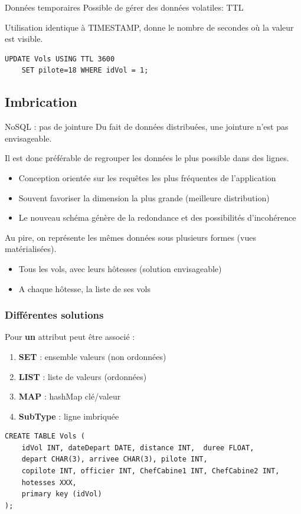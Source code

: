 \begin{frame}[fragile]{Données temporaires}
	Possible de gérer des données volatiles: \alert{TTL}

	Utilisation identique à TIMESTAMP, donne le nombre de secondes où la valeur est visible.

\footnotesize
\begin{verbatim}
UPDATE Vols USING TTL 3600
    SET pilote=18 WHERE idVol = 1;
\end{verbatim}
\end{frame}
	
\subsection[Nesting]{Imbrication}

\begin{frame}[fragile]{NoSQL : pas de jointure}
Du fait de données distribuées, une jointure n'est pas envisageable.

Il est donc préférable de \alert{regrouper} les données le plus possible dans des lignes.
	
	\begin{itemize}
		\item Conception orientée sur les requêtes les plus fréquentes de l'application
		\item Souvent favoriser la dimension la plus grande (meilleure distribution)
		\item \danger Le nouveau schéma génère de la redondance et des possibilités d'incohérence
	\end{itemize}
	
	\vfill
	
	Au pire, on représente les mêmes données sous plusieurs formes (vues matérialisées).
	
	\begin{itemize}
		\item Tous les vols, avec leurs hôtesses (solution envisageable)
		\item A chaque hôtesse, la liste de ses vols
	\end{itemize}
	
\end{frame}

\begin{frame}[fragile]
\frametitle{Différentes solutions}
Pour \textbf{un} attribut peut être associé :
\begin{enumerate}
	\item \textbf{SET} : ensemble valeurs (non ordonnées)
	\item \textbf{LIST} : liste de valeurs (ordonnées)
	\item \textbf{MAP} : hashMap clé/valeur
	\item \textbf{SubType} : ligne imbriquée
\end{enumerate}
\footnotesize
\begin{verbatim}
CREATE TABLE Vols (
    idVol INT, dateDepart DATE, distance INT,  duree FLOAT,
    depart CHAR(3), arrivee CHAR(3), pilote INT, 
    copilote INT, officier INT, ChefCabine1 INT, ChefCabine2 INT,
    hotesses XXX,
    primary key (idVol) 
);
\end{verbatim}
\normalsize
\end{frame}
	
